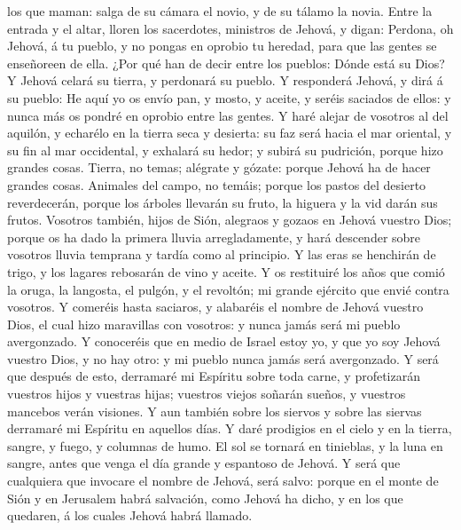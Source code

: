 los que maman: salga de su cámara el novio, y de su tálamo la novia.
 Entre la entrada y el altar, lloren los sacerdotes,
ministros de Jehová, y digan: Perdona, oh Jehová, á tu pueblo, y no
pongas en oprobio tu heredad, para que las gentes se enseñoreen de ella.
¿Por qué han de decir entre los pueblos: Dónde está su Dios?
 Y Jehová celará su tierra, y perdonará su pueblo.
 Y responderá Jehová, y dirá á su pueblo: He aquí yo os
envío pan, y mosto, y aceite, y seréis saciados de ellos: y nunca más os
pondré en oprobio entre las gentes.  Y haré alejar de
vosotros al del aquilón, y echarélo en la tierra seca y desierta: su faz
será hacia el mar oriental, y su fin al mar occidental, y exhalará su
hedor; y subirá su pudrición, porque hizo grandes cosas. 
Tierra, no temas; alégrate y gózate: porque Jehová ha de hacer grandes
cosas.  Animales del campo, no temáis; porque los pastos
del desierto reverdecerán, porque los árboles llevarán su fruto, la
higuera y la vid darán sus frutos.  Vosotros también,
hijos de Sión, alegraos y gozaos en Jehová vuestro Dios; porque os ha
dado la primera lluvia arregladamente, y hará descender sobre vosotros
lluvia temprana y tardía como al principio.  Y las eras
se henchirán de trigo, y los lagares rebosarán de vino y aceite.
 Y os restituiré los años que comió la oruga, la
langosta, el pulgón, y el revoltón; mi grande ejército que envié contra
vosotros.  Y comeréis hasta saciaros, y alabaréis el
nombre de Jehová vuestro Dios, el cual hizo maravillas con vosotros: y
nunca jamás será mi pueblo avergonzado.  Y conoceréis que
en medio de Israel estoy yo, y que yo soy Jehová vuestro Dios, y no hay
otro: y mi pueblo nunca jamás será avergonzado.  Y será
que después de esto, derramaré mi Espíritu sobre toda carne, y
profetizarán vuestros hijos y vuestras hijas; vuestros viejos soñarán
sueños, y vuestros mancebos verán visiones.  Y aun
también sobre los siervos y sobre las siervas derramaré mi Espíritu en
aquellos días.  Y daré prodigios en el cielo y en la
tierra, sangre, y fuego, y columnas de humo.  El sol se
tornará en tinieblas, y la luna en sangre, antes que venga el día grande
y espantoso de Jehová.  Y será que cualquiera que
invocare el nombre de Jehová, será salvo: porque en el monte de Sión y
en Jerusalem habrá salvación, como Jehová ha dicho, y en los que
quedaren, á los cuales Jehová habrá llamado.

